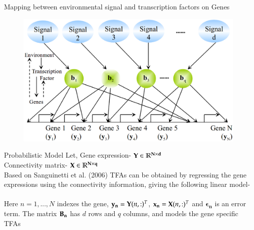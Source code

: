 \documentclass[serif,mathserif,final]{beamer}
\begin{document}
\begin{frame}{}
\begin{columns}[t]
\begin{column}{0.24\linewidth}
      \begin{block}{Mapping between environmental signal and transcription factors on Genes}

      
	  \begin{figure}[!htb]
	  \centering
	  \includegraphics[scale=.43]{picture/signaltoTFA.eps}
	  \label{fig: mapping }
	  \end{figure}
      
      
      \end{block}

      \begin{block}{Probabilistic Model}
	  Let, Gene expression- $ \bold{Y} \in \mathbb{R} ^ { \bold{N} \times \bold{d} } $ \\
	  Connectivity matrix- $ \bold{X} \in \mathbb{R} ^ { \bold{N} \times \bold{q} } $ \\

	  Based on Sanguinetti et al. (2006) TFAs can be obtained by regressing the gene expressions using the connectivity information, giving the following linear model- \\
	   \\

	  Here $n = 1, . . . ,N$ indexes the gene, $ \bold{y_{n}} = \bold{Y}(n,:)^T $, $ \bold{x_{n}} = \bold{X}(n,:)^T $ and  $ \boldsymbol{\epsilon_{n}} $ is an error term. The matrix $ \bold{B_{n}} $ has $ d $ rows and $ q $ columns, and models the gene specific TFAs \\~\\
      

\end{block}
\end{column}
\end{columns}
\end{frame}
\end{document}
